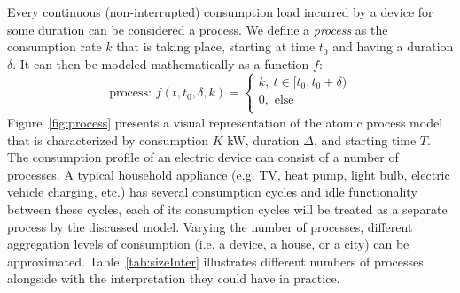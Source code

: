 \documentclass[conference]{IEEEtran}
\begin{document}
Every continuous (non-interrupted) consumption load incurred by a device for some duration can be considered a process.  We define a \emph{process} as the consumption rate $k$ that is taking place, starting at time $t_0$ and having a duration $\delta$. It can then be modeled mathematically as a function $f$:
\begin{equation}
\text{process: }f(t, t_0, \delta, k) =
\left\lbrace
\begin{array}{l}
 k,~t \in [t_0, t_0+\delta)\\
 0, \text{ else}\\
\end{array}
\right.
\end{equation}
Figure~\ref{fig:process} presents a visual representation of the atomic process model that is characterized by consumption $K$ kW, duration $\Delta$, and starting time $T$. The consumption profile of an electric device can consist of a number of processes. A typical household appliance (e.g. TV, heat pump, light bulb, electric vehicle charging, etc.) has several consumption cycles and idle functionality between these cycles, each of its consumption cycles will be treated as a separate process by the discussed model. Varying the number of processes, different aggregation levels of consumption (i.e. a device, a house, or a city) can be approximated. Table~\ref{tab:sizeInter} illustrates different numbers of processes alongside with the interpretation they could have in practice.
\end{document}
